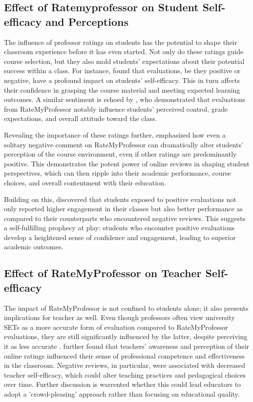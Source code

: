 \documentclass[man, 12pt]{apa7}
\begin{document}
\subsection{Effect of Ratemyprofessor on Student Self-efficacy and Perceptions}
The influence of professor ratings on students has the potential to shape their classroom experience before it has even started. Not only do these ratings guide course selection, but they also mold students' expectations about their potential success within a class. For instance, \textcite{boswell_effects_2020} found that evaluations, be they positive or negative, have a profound impact on students' self-efficacy. This in turn affects their confidence in grasping the course material and meeting expected learning outcomes. A similar sentiment is echoed by \textcite{kowai-bell_rate_2011}, who demonstrated that evaluations from RateMyProfessor notably influence students' perceived control, grade expectations, and overall attitude toward the class.

Revealing the importance of these ratings further, \textcite{scherr_single_2013} emphasized how even a solitary negative comment on RateMyProfessor can dramatically alter students' perception of the course environment, even if other ratings are predominantly positive. This demonstrates the potent power of online reviews in shaping student perspectives, which can then ripple into their academic performance, course choices, and overall contentment with their education.

Building on this, \textcite{reber_perceptual_2017} discovered that students exposed to positive evaluations not only reported higher engagement in their classes but also better performance as compared to their counterparts who encountered negative reviews. This suggests a self-fulfilling prophecy at play: students who encounter positive evaluations develop a heightened sense of confidence and engagement, leading to superior academic outcomes.

\subsection{Effect of RateMyProfessor on Teacher Self-efficacy}
The impact of RateMyProfessor is not confined to students alone; it also presents implications for teacher as well. Even though professors often view university SETs as a more accurate form of evaluation compared to RateMyProfessor evaluations, they are still significantly influenced by the latter, despite perceiving it as less accurate \textcite{boswell_ratemyprofessors_2016}. \textcite{boswell_ratemyprofessors_2016} further found that teachers' awareness and perception of their online ratings influenced their sense of professional competence and effectiveness in the classroom. Negative reviews, in particular, were associated with decreased teacher self-efficacy, which could alter teaching practices and pedagogical choices over time. Further discussion is warrented whether this could lead educators to adopt a 'crowd-pleasing' approach rather than focusing on educational quality.
\end{document}
